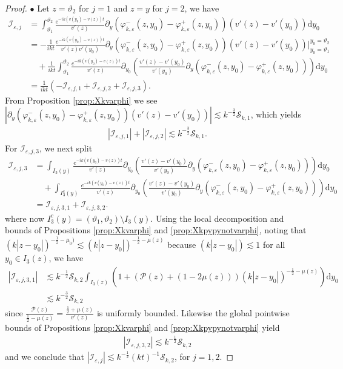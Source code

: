 \documentclass[11pt,reqno]{amsproc}
\newcommand{\bullpar}[1]{\vspace{.5em}\noindent $\bullet$ \normalfont {\bfseries #1.}}
\theoremstyle{definition}
\numberwithin{equation}{section}
\newcommand{\cI}{{\mathcal I}}
\newcommand{\cS}{{\mathcal S}}
\renewcommand{\d}{\mathrm{d}}
\newcommand{\ep}{\varepsilon}
\renewcommand{\P}{{\mathcal{P}}}
\begin{document}
\begin{proof}
\bullpar{Estimates for $\cI_{\ep,1}$ and $\cI_{\ep,2}$} Let $z=\vartheta_2$ for $j=1$ and $z=y$ for $j=2$, we have
\begin{align*}
\cI_{\ep,j} &= \int_{\vartheta_1}^{\vartheta_2} \frac{e^{-ik(v(y_0)-v(z)) t}}{v'(z)} \partial_y \left( \varphi_{k,\ep}^-(z,y_0) - \varphi_{k,\ep}^+(z,y_0) \right) (v'(z) - v'(y_0) ) \d y_0 \\
&= - \frac{1}{ikt} \frac{e^{-ik(v(y_0) - v(z))t}}{v'(z)v'(y_0)} \partial_y \left( \varphi_{k,\ep}^-(z,y_0) - \varphi_{k,\ep}^+(z,y_0) \right) (v'(z) - v'(y_0) ) \Big|_{y_0=\vartheta_1}^{y_0=\vartheta_2} \\
&\quad + \frac{1}{ikt}\int_{\vartheta_1}^{\vartheta_2}\frac{e^{-ik(v(y_0) - v(z))t}}{v'(z)} \partial_{y_0} \left( \frac{v'(z) - v'(y_0)}{v'(y_0)}\partial_y \left( \varphi_{k,\ep}^-(z,y_0) - \varphi_{k,\ep}^+(z,y_0) \right) \right) \d y_0 \\
&=\frac{1}{ikt}\left( -\cI_{\ep,j,1} + \cI_{\ep,j,2} + \cI_{\ep,j,3} \right).
\end{align*}
From Proposition \ref{prop:Xkvarphi} we see $\left| \partial_y \left( \varphi_{k,\ep}^-(z,y_0) - \varphi_{k,\ep}^+(z,y_0) \right) (v'(z) - v'(y_0) ) \right| \lesssim k^{-\frac32}\cS_{k,1}$, which yields
\begin{align*}
| \cI_{\ep,j,1} | + | \cI_{\ep,j,2} | \lesssim k^{-\frac32}\cS_{k,1}.
\end{align*}
For $\cI_{\ep,j,3}$, we next split
\begin{align*}
\cI_{\ep,j,3} &=\int_{I_3(y)}\frac{e^{-ik(v(y_0) - v(z))t}}{v'(z)} \partial_{y_0} \left( \frac{v'(z) - v'(y_0)}{v'(y_0)}\partial_y \left( \varphi_{k,\ep}^-(z,y_0) - \varphi_{k,\ep}^+(z,y_0) \right) \right) \d y_0 \\
&\quad + \int_{I_3^c(y)}\frac{e^{-ik(v(y_0) - v(z))t}}{v'(z)} \partial_{y_0} \left( \frac{v'(z) - v'(y_0)}{v'(y_0)}\partial_y \left( \varphi_{k,\ep}^-(z,y_0) - \varphi_{k,\ep}^+(z,y_0) \right) \right) \d y_0 \\
&= \cI_{\ep,j,3,1} + \cI_{\ep,j,3,2}.
\end{align*}
where now $I_3^c(y) = (\vartheta_1,\vartheta_2)\setminus I_3(y)$. Using the local decomposition and bounds of Propositions \ref{prop:Xkvarphi} and \ref{prop:Xkpypynotvarphi}, noting that $(k|z-y_0|)^{-\frac12-\mu_0)}\lesssim (k|z-y_0|)^{-\frac12-\mu(z)}$ because  $(k|z-y_0|)\lesssim 1$ for all  $y_0\in I_3(z)$,  we have
\begin{align*}
|\cI_{\ep,j,3,1}|&\lesssim k^{-\frac12}\cS_{k,2} \int_{I_3(z)} \left( 1 + \left( \P(z) + (1-2\mu(z)) \right)(k|z-y_0|)^{-\frac12-\mu(z)} \right) \d y_0 \\
&\lesssim k^{-\frac32}\cS_{k,2}
\end{align*}
since $\frac{\P(z)}{\frac12-\mu(z)} = \frac{\frac12+\mu(z)}{v'(z)}$ is uniformly bounded. Likewise the global pointwise bounds of Propositions \ref{prop:Xkvarphi} and \ref{prop:Xkpypynotvarphi} yield
\begin{align*}
|\cI_{\ep,j,3,2}| \lesssim k^{-\frac12}\cS_{k,2}
\end{align*}
and we conclude that $|\cI_{\ep,j}| \lesssim k^{-\frac12}(kt)^{-1}\cS_{k,2}$, for $j=1,2$.


\end{proof}
\end{document}
